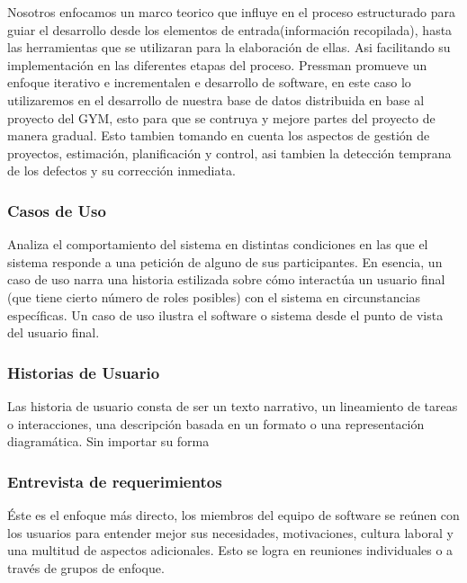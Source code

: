 \documentclass[spanish, 12pt]{article}
\begin{document}
	Nosotros enfocamos un marco teorico que influye en el proceso estructurado
	para guiar el desarrollo desde los elementos de entrada(información recopilada),
	hasta las herramientas que se utilizaran para la elaboración de ellas. Asi facilitando
	su implementación en las diferentes etapas del proceso. Pressman promueve un
	enfoque iterativo e incrementalen e desarrollo de software, en este caso lo utilizaremos
	en el desarrollo de nuestra base de datos distribuida en base al proyecto del GYM,
	esto para que se contruya y mejore partes del proyecto de manera gradual. Esto
	tambien tomando en cuenta los aspectos de gestión de proyectos, estimación, planificación
	y control, asi tambien la detección temprana de los defectos y su corrección
	inmediata.

	\subsubsection{Casos de Uso}
	\label{casos-de-uso}

	Analiza el comportamiento del sistema en distintas condiciones en las que el sistema
	responde a una petición de alguno de sus participantes. En esencia, un caso de
	uso narra una historia estilizada sobre cómo interactúa un usuario final (que
	tiene cierto número de roles posibles) con el sistema en circunstancias específicas.
	Un caso de uso ilustra el software o sistema desde el punto de vista del
	usuario final.

	\subsubsection{Historias de Usuario}
	\label{historias-de-usuario}

	Las historia de usuario consta de ser un texto narrativo, un lineamiento de
	tareas o interacciones, una descripción basada en un formato o una representación
	diagramática. Sin importar su forma

	\subsubsection{Entrevista de requerimientos}
	\label{entrevista-de-requerimientos}

	Éste es el enfoque más directo, los miembros del equipo de software se reúnen con
	los usuarios para entender mejor sus necesidades, motivaciones, cultura laboral
	y una multitud de aspectos adicionales. Esto se logra en reuniones
	individuales o a través de grupos de enfoque.
\end{document}
